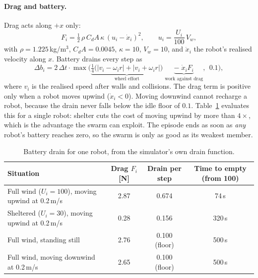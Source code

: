\documentclass[11pt]{article}
\begin{document}
\paragraph{Drag and battery.} Drag acts along $+x$ only:
\begin{equation}
F_i = \tfrac12\,\rho\,C_dA\,\kappa\,(u_i - \dot x_i)^2, \qquad u_i = \frac{U_i}{100}\,V_w,
\end{equation}
with $\rho = 1.225$\,kg/m$^3$, $C_dA = 0.0045$, $\kappa = 10$, $V_w = 10$, and $\dot x_i$ the
robot's realised velocity along $x$. Battery drains every step as
\begin{equation}
\Delta b_i = 2\,\Delta t\cdot\max\!\Big(\underbrace{\tfrac14\big(|v_i - \omega_i r| + |v_i + \omega_i r|\big)}_{\text{wheel effort}}
\;\underbrace{-\;\dot x_i F_i}_{\text{work against drag}},\ \ 0.1\Big),
\end{equation}
where $v_i$ is the realised speed after walls and collisions. The drag term is positive only
when a robot moves upwind ($\dot x_i < 0$). Moving downwind cannot recharge a robot, because
the drain never falls below the idle floor of $0.1$. Table~\ref{tab:drain} evaluates this for
a single robot: shelter cuts the cost of moving upwind by more than $4\times$, which is the
advantage the swarm can exploit. The episode ends as soon as \emph{any} robot's battery
reaches zero, so the swarm is only as good as its weakest member.

\begin{table}[h]
\centering
\caption{Battery drain for one robot, from the simulator's own drain function.}
\label{tab:drain}
\begin{tabular}{@{}lccc@{}}
\toprule
Situation & Drag $F_i$ [N] & Drain per step & Time to empty (from 100) \\
\midrule
Full wind ($U_i = 100$), moving upwind at 0.2\,m/s & 2.87 & 0.674 & 74\,s \\
Sheltered ($U_i = 30$), moving upwind at 0.2\,m/s & 0.28 & 0.156 & 320\,s \\
Full wind, standing still & 2.76 & 0.100 (floor) & 500\,s \\
Full wind, moving downwind at 0.2\,m/s & 2.65 & 0.100 (floor) & 500\,s \\
\bottomrule
\end{tabular}
\end{table}
\end{document}
